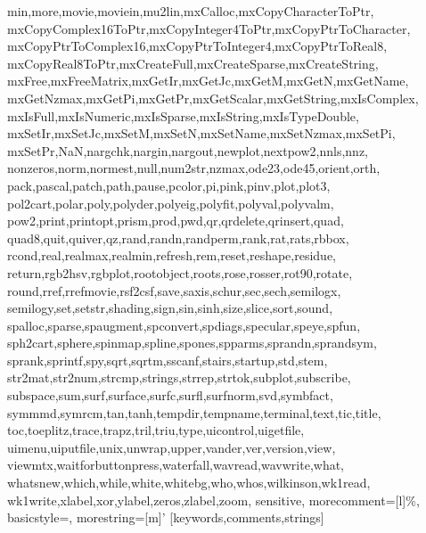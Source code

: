 {{      min,more,movie,moviein,mu2lin,mxCalloc,mxCopyCharacterToPtr,%
      mxCopyComplex16ToPtr,mxCopyInteger4ToPtr,mxCopyPtrToCharacter,%
      mxCopyPtrToComplex16,mxCopyPtrToInteger4,mxCopyPtrToReal8,%
      mxCopyReal8ToPtr,mxCreateFull,mxCreateSparse,mxCreateString,%
      mxFree,mxFreeMatrix,mxGetIr,mxGetJc,mxGetM,mxGetN,mxGetName,%
      mxGetNzmax,mxGetPi,mxGetPr,mxGetScalar,mxGetString,mxIsComplex,%
      mxIsFull,mxIsNumeric,mxIsSparse,mxIsString,mxIsTypeDouble,%
      mxSetIr,mxSetJc,mxSetM,mxSetN,mxSetName,mxSetNzmax,mxSetPi,%
      mxSetPr,NaN,nargchk,nargin,nargout,newplot,nextpow2,nnls,nnz,%
      nonzeros,norm,normest,null,num2str,nzmax,ode23,ode45,orient,orth,%
      pack,pascal,patch,path,pause,pcolor,pi,pink,pinv,plot,plot3,%
      pol2cart,polar,poly,polyder,polyeig,polyfit,polyval,polyvalm,%
      pow2,print,printopt,prism,prod,pwd,qr,qrdelete,qrinsert,quad,%
      quad8,quit,quiver,qz,rand,randn,randperm,rank,rat,rats,rbbox,%
      rcond,real,realmax,realmin,refresh,rem,reset,reshape,residue,%
      return,rgb2hsv,rgbplot,rootobject,roots,rose,rosser,rot90,rotate,%
      round,rref,rrefmovie,rsf2csf,save,saxis,schur,sec,sech,semilogx,%
      semilogy,set,setstr,shading,sign,sin,sinh,size,slice,sort,sound,%
      spalloc,sparse,spaugment,spconvert,spdiags,specular,speye,spfun,%
      sph2cart,sphere,spinmap,spline,spones,spparms,sprandn,sprandsym,%
      sprank,sprintf,spy,sqrt,sqrtm,sscanf,stairs,startup,std,stem,%
      str2mat,str2num,strcmp,strings,strrep,strtok,subplot,subscribe,%
      subspace,sum,surf,surface,surfc,surfl,surfnorm,svd,symbfact,%
      symmmd,symrcm,tan,tanh,tempdir,tempname,terminal,text,tic,title,%
      toc,toeplitz,trace,trapz,tril,triu,type,uicontrol,uigetfile,%
      uimenu,uiputfile,unix,unwrap,upper,vander,ver,version,view,%
      viewmtx,waitforbuttonpress,waterfall,wavread,wavwrite,what,%
      whatsnew,which,while,white,whitebg,who,whos,wilkinson,wk1read,%
      wk1write,xlabel,xor,ylabel,zeros,zlabel,zoom},%
   sensitive,%
   morecomment=[l]\%,%
   basicstyle=\tiny,%
   morestring=[m]'%
  }[keywords,comments,strings]%

\usepackage{algorithmic}

\usepackage{url}

\newcommand{\RR}{\mathbb{R}}
\newcommand{\CC}{\mathbb{C}}


\newtheorem{theorem}{Theorem}[section]
\newtheorem{lemma}[theorem]{Lemma}
\newtheorem{proposition}[theorem]{Proposition}
\newtheorem{corollary}[theorem]{Corollary}
\newtheorem{axiom}[theorem]{Axiom}
\newtheorem{definition}[theorem]{Definition}
\newtheorem{remark}[theorem]{Remark}


